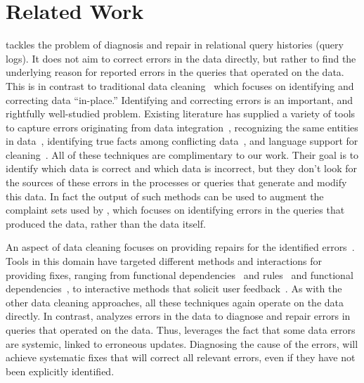 
\section{Related Work}
\label{s:related} 
\sys tackles the problem of diagnosis and repair in relational query
histories (query logs). It does not aim to correct errors in the data
directly, but rather to find the underlying reason for reported errors
in the queries that operated on the data. This is in contrast to
traditional data 
cleaning~\cite{dallachiesa2013nadeef, rahm00, Raman01, Kalashnikov06, Fan2008b
} which focuses on identifying and correcting data
``in-place.'' Identifying and correcting errors is an important, and
rightfully well-studied problem. Existing literature has supplied a
variety of tools to capture errors originating from data
integration~\cite{Abiteboul99
},
recognizing the same entities in data~\cite{Koudas2006, GruenheidDS14
}, identifying true facts among conflicting
data~\cite{yin2008truth, DN09, ltm2012
}, and language support for
cleaning~\cite{Galhardas2000}. All of these techniques are
complimentary to our work. Their goal is to identify which data is
correct and which data is incorrect, but they don't look for the
sources of these errors in the processes or queries that generate and
modify this data. In fact the output of such methods can be used to
augment the complaint sets used by \sys, which focuses on identifying
errors in the queries that produced the data, rather than the data
itself.

An aspect of data cleaning focuses on providing repairs for the
identified errors~\cite{ChuIP13}. Tools in this domain have targeted
different methods and interactions for providing fixes, ranging from
functional dependencies~\cite{Fan2008b, ChuIP13
} and
rules~\cite{Beskales2010, Cong2007
} and functional
dependencies~\cite{Fan2008b, ChuIP13
}, to interactive methods that
solicit user feedback~\cite{Yakout, Raman01
}. As with the other data
cleaning approaches, all these techniques again operate on the data
directly. In contrast, \sys analyzes errors in the data to diagnose
and repair errors in queries that operated on the data. Thus, \sys
leverages the fact that some data errors are systemic, linked to
erroneous updates. Diagnosing the cause of the errors, will achieve
systematic fixes that will correct all relevant errors, even if they
have not been explicitly identified.

